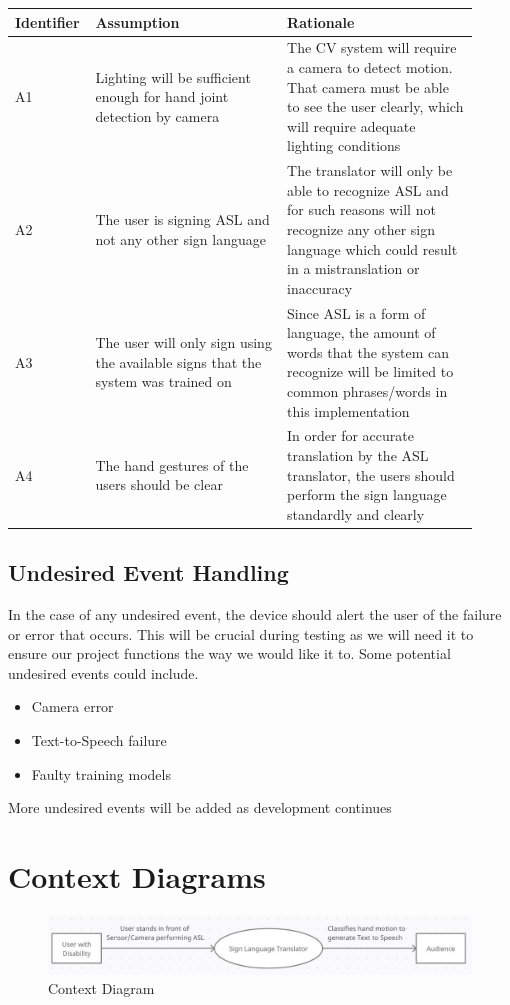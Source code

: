 \documentclass[12pt]{article}
\begin{document}
\renewcommand{\arraystretch}{1.2}
\noindent \begin{tabularx}{\textwidth}{p{0.12\linewidth}|p{0.4\linewidth}|p{0.4\linewidth}}
\toprule
\textbf{Identifier} & \textbf{Assumption} & \textbf{Rationale}\\
\midrule
A1 
& Lighting will be sufficient enough for hand joint detection by camera 
& The CV system will require a camera to detect motion. That camera must be able to see the user clearly, 
which will require adequate lighting conditions\\
\hline
A2
& The user is signing ASL and not any other sign language
& The translator will only be able to recognize ASL and for such reasons will not recognize any other sign language 
which could result in a mistranslation or inaccuracy\\
\hline
A3
& The user will only sign using the available signs that the system was trained on
& Since ASL is a form of language, the amount of words that the system can recognize will be limited to common phrases/words in this implementation\\
\hline
A4
& The hand gestures of the users should be clear
& In order for accurate translation by the ASL translator, the users should perform the sign language standardly and clearly\\
\bottomrule
\end{tabularx}

\subsection{Undesired Event Handling}
In the case of any undesired event, the device should alert the user of the failure or error 
that occurs. This will be crucial during testing as we will need it to ensure our project functions
the way we would like it to. Some potential undesired events could include.
\begin{itemize}
    \item Camera error
    \item Text-to-Speech failure
    \item Faulty training models
\end{itemize}
More undesired events will be added as development continues


\section{Context Diagrams}

\begin{figure}[H] 
\centering
\includegraphics[width=\textwidth,height=0.88\textheight,keepaspectratio]{Context Diagram.JPG} 
\caption{Context Diagram} 
\label{Fig.Context_Diagram} 
\end{figure}
\end{document}
